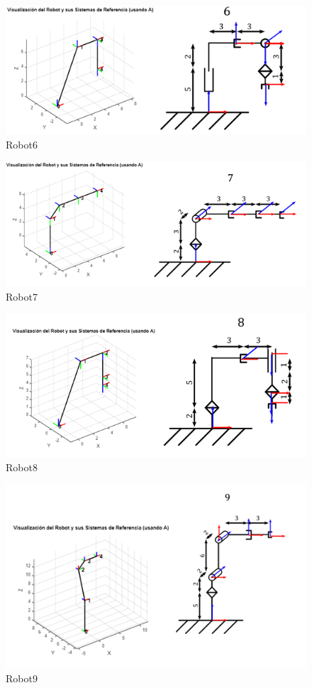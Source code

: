 \begin{figure} [h]
	\centering
	\includegraphics[width=0.9\linewidth]{"../Ejercicios DH/img/robot6"}
	\caption{Robot6}
	\label{fig:robot6}
\end{figure}


\begin{figure} [h]
	\centering
	\includegraphics[width=0.9\linewidth]{"../Ejercicios DH/img/robot7"}
	\caption{Robot7}
	\label{fig:robot7}
\end{figure}


\begin{figure} [h]
	\centering
	\includegraphics[width=0.9\linewidth]{"../Ejercicios DH/img/robot8"}
	\caption{Robot8}
	\label{fig:robot8}
\end{figure}


\begin{figure} [h]
	\centering
	\includegraphics[width=0.9\linewidth]{"../Ejercicios DH/img/robot9"}
	\caption{Robot9}
	\label{fig:robot9}
\end{figure}


